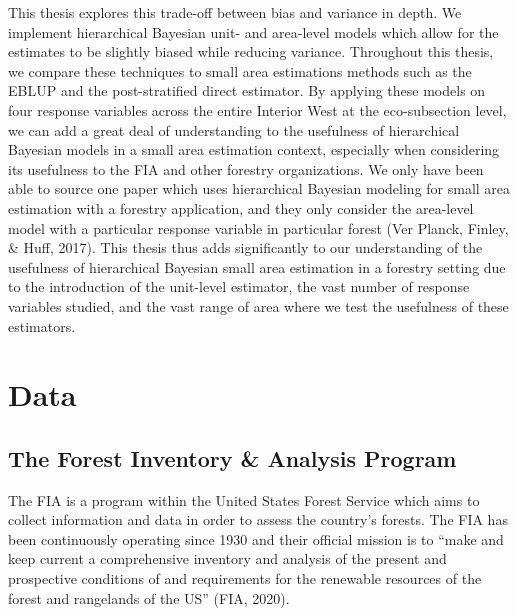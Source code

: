 \documentclass[12pt,twoside]{reedthesis}
\begin{document}
This thesis explores this trade-off between bias and variance in depth. We implement hierarchical Bayesian unit- and area-level models which allow for the estimates to be slightly biased while reducing variance. Throughout this thesis, we compare these techniques to small area estimations methods such as the EBLUP and the post-stratified direct estimator. By applying these models on four response variables across the entire Interior West at the eco-subsection level, we can add a great deal of understanding to the usefulness of hierarchical Bayesian models in a small area estimation context, especially when considering its usefulness to the FIA and other forestry organizations. We only have been able to source one paper which uses hierarchical Bayesian modeling for small area estimation with a forestry application, and they only consider the area-level model with a particular response variable in particular forest (Ver Planck, Finley, \& Huff, 2017). This thesis thus adds significantly to our understanding of the usefulness of hierarchical Bayesian small area estimation in a forestry setting due to the introduction of the unit-level estimator, the vast number of response variables studied, and the vast range of area where we test the usefulness of these estimators.

\hypertarget{data}{%
\chapter{Data}\label{data}}

\hypertarget{the-forest-inventory-analysis-program}{%
\section{The Forest Inventory \& Analysis Program}\label{the-forest-inventory-analysis-program}}

The FIA is a program within the United States Forest Service which aims to collect information and data in order to assess the country's forests. The FIA has been continuously operating since 1930 and their official mission is to ``make and keep current a comprehensive inventory and analysis of the present and prospective conditions of and requirements for the renewable resources of the forest and rangelands of the US'' (FIA, 2020).
\end{document}
